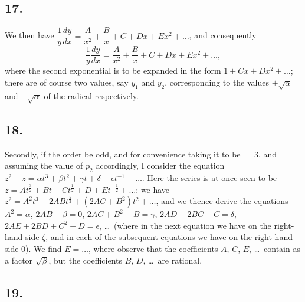 \documentclass[11pt,a4paper]{book}
\begin{document}
\subsection*{17.}

We then have $\dfrac{1}{y}\dfrac{dy}{dx} = \dfrac{A}{x^2} + \dfrac{B}{x} + C + Dx + Ex^2 + \ldots$, and consequently
\[
\frac{1}{y}\frac{dy}{dx} = \frac{A}{x^2} + \frac{B}{x} + C + Dx + Ex^2 + \ldots,
\]
where the second exponential is to be expanded in the form $1 + Cx + Dx^2 + \ldots$; there are of course two values, say $y_1$ and $y_2$, corresponding to the values $+\sqrt{\alpha}$ and $-\sqrt{\alpha}$ of the radical respectively.

\subsection*{18.}

Secondly, if the order be odd, and for convenience taking it to be $= 3$, and assuming the value of $p_2$ accordingly, I consider the equation $z^2 + z = \alpha t^3 + \beta t^2 + \gamma t + \delta + \epsilon t^{-1} + \ldots$. Here the series is at once seen to be $z = At^{\frac{3}{2}} + Bt + Ct^{\frac{1}{2}} + D + Et^{-\frac{1}{2}} + \ldots$: we have $z^2 = A^2 t^3 + 2AB t^{\frac{5}{2}} + (2AC + B^2)t^2 + \ldots$, and we thence derive the equations $A^2 = \alpha$, $2AB - \beta = 0$, $2AC + B^2 - B = \gamma$, $2AD + 2BC - C = \delta$, $2AE + 2BD + C^2 - D = \epsilon$, \ldots\ (where in the next equation we have on the right-hand side $\zeta$, and in each of the subsequent equations we have on the right-hand side $0$). We find $E = \ldots$, where observe that the coefficients $A$, $C$, $E$, \ldots\ contain as a factor $\sqrt{\beta}$, but the coefficients $B$, $D$, \ldots\ are rational.

\subsection*{19.}
\end{document}
